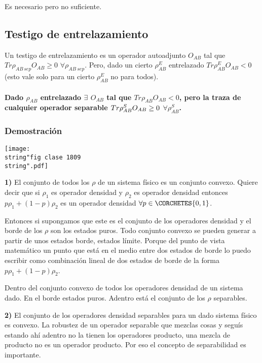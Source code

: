 Es necesario pero no suficiente.

\subsection{Testigo de entrelazamiento}

Un testigo de entrelazamiento es un operador autoadjunto $O_{AB}$
tal que $Tr\rho_{AB\,sep}O_{AB}\geq0$ $\forall\rho_{AB\:sep}$. Pero,
dado un cierto $\rho_{AB}^{E}$ entrelazado $Tr\rho_{AB}^{E}O_{AB}<0$
(esto vale solo para un cierto $\rho_{AB}^{E}$ no para todos).

\paragraph{Dado $\rho_{AB}$ entrelazado $\exists$ $O_{AB}$ tal que $Tr\rho_{AB}O_{AB}<0$,
pero la traza de cualquier operador separable $Tr\rho_{AB}^{S}O_{AB}\protect\geq0$
$\forall\rho_{AB}^{S}$. }


\subsubsection{Demostración}
\begin{center}
\texttt{[image: \\string"fig clase 1809\\string".pdf]}
\par\end{center}

\textbf{1) }El conjunto de todos los $\rho$ de un sistema físico
es un conjunto convexo. Quiere decir que si $\rho_{1}$ es operador
densidad y $\rho_{2}$ es operador densidad entonces $p\rho_{1}+(1-p)\rho_{2}$
es un operador densidad $\forall p\in\CORCHETES{0,1}$. 

Entonces si supongamos que este es el conjunto de los operadores densidad
y el borde de los $\rho$ son los estados puros. Todo conjunto convexo
se pueden generar a partir de unos estados borde, estados límite.
Porque del punto de vista matemático un punto que está en el medio
entre dos estados de borde lo puedo escribir como combinación lineal
de dos estados de borde de la forma $p\rho_{1}+(1-p)\rho_{2}$.

Dentro del conjunto convexo de todos los operadores densidad de un
sistema dado. En el borde estados puros. Adentro está el conjunto
de los $\rho$ separables.

\textbf{2) }El conjunto de los operadores densidad separables para
un dado sistema físico es convexo. La robustez de un operador separable
que mezclas cosas y seguís estando ahí adentro no la tienen los operadores
producto, una mezcla de producto no es un operador producto. Por eso
el concepto de separabilidad es importante.


